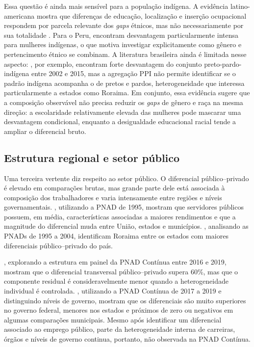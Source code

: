 \documentclass[12pt,a4paper]{article}
\begin{document}
Essa questão é ainda mais sensível para a população indígena. A evidência
latino-americana mostra que diferenças de educação, localização e inserção ocupacional
respondem por parcela relevante dos \textit{gaps} étnicos, mas não necessariamente por sua
totalidade \citep{canelas2014, canedo2019}. Para o Peru, \citet{kolev2015} encontram
desvantagem particularmente intensa para mulheres indígenas, o que motiva investigar
explicitamente como gênero e pertencimento étnico se combinam. A literatura brasileira
ainda é limitada nesse aspecto: \citet{marques2024}, por exemplo, encontram forte
desvantagem do conjunto preto-pardo-indígena entre 2002 e 2015, mas a agregação PPI não
permite identificar se o padrão indígena acompanha o de pretos e pardos, heterogeneidade
que interessa particularmente a estados como Roraima. Em conjunto, essa evidência sugere
que a composição observável não precisa reduzir os \textit{gaps} de gênero e raça na mesma
direção: a escolaridade relativamente elevada das mulheres pode mascarar uma desvantagem
condicional, enquanto a desigualdade educacional racial tende a ampliar o diferencial
bruto.

\subsection{Estrutura regional e setor público}

Uma terceira vertente diz respeito ao setor público. O diferencial público–privado é
elevado em comparações brutas, mas grande parte dele está associada à composição dos
trabalhadores e varia intensamente entre regiões e níveis governamentais.
\citet{foguel2000}, utilizando a PNAD de 1995, mostram que servidores públicos possuem, em
média, características associadas a maiores rendimentos e que a magnitude do diferencial
muda entre União, estados e municípios. \citet{moriconi2009}, analisando as PNADs de 1995
a 2004, identificam Roraima entre os estados com maiores diferenciais público–privado do
país.

\citet{mattos2022}, explorando a estrutura em painel da PNAD Contínua entre 2016 e 2019,
mostram que o diferencial transversal público–privado supera 60\%, mas que o componente
residual é consideravelmente menor quando a heterogeneidade individual é controlada.
\citet{baez2021}, utilizando a PNAD Contínua de 2017 a 2019 e distinguindo níveis de
governo, mostram que os diferenciais são muito superiores no governo federal, menores nos
estados e próximos de zero ou negativos em algumas comparações municipais. Mesmo após
identificar um diferencial associado ao emprego público, parte da heterogeneidade interna
de carreiras, órgãos e níveis de governo continua, portanto, não observada na PNAD
Contínua.
\end{document}
